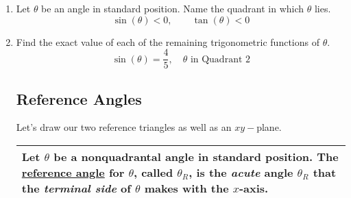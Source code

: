 \begin{enumerate}
\item Let $\theta$ be an angle in standard position.  Name the
  quadrant in which $\theta$ lies.
$$\sin(\theta)<0, \quad \quad \tan(\theta)<0$$


\newpage

\item Find the exact value of each of the remaining trigonometric functions of $\theta$.
$$\sin(\theta)=\frac{4}{5}, \quad  \theta \text{ in Quadrant 2}$$\vfill


\subsection{Reference Angles} 

Let's draw our two reference triangles as well as an $xy-$plane.\\[1.5in]
\hspace{-.3in}
\begin{tabular}{| p{} |} \hline
  Let $\theta$ be a
  nonquadrantal angle in standard position.  The \underline{reference
  angle} for $\theta$, called $\theta_R$, is the \emph{acute} angle
  $\theta_R$ that the \emph{terminal side} of $\theta$ makes with the
  $x$-axis. \\ \hline
\end{tabular}
              

\end{enumerate}
